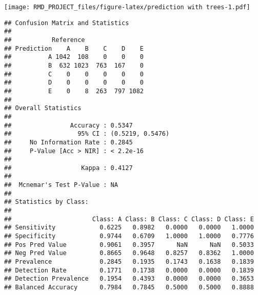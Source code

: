 \documentclass[]{article}
\newenvironment{Shaded}{\begin{snugshade}}{\end{snugshade}}
\newcommand{\CommentTok}[1]{\textcolor[rgb]{0.56,0.35,0.01}{\textit{#1}}}
\newcommand{\DataTypeTok}[1]{\textcolor[rgb]{0.13,0.29,0.53}{#1}}
\newcommand{\DecValTok}[1]{\textcolor[rgb]{0.00,0.00,0.81}{#1}}
\newcommand{\KeywordTok}[1]{\textcolor[rgb]{0.13,0.29,0.53}{\textbf{#1}}}
\newcommand{\NormalTok}[1]{#1}
\newcommand{\OperatorTok}[1]{\textcolor[rgb]{0.81,0.36,0.00}{\textbf{#1}}}
\newcommand{\StringTok}[1]{\textcolor[rgb]{0.31,0.60,0.02}{#1}}
\begin{document}
\begin{Shaded}
\end{Shaded}

\texttt{[image: RMD\_PROJECT\_files/figure-latex/prediction with trees-1.pdf]}

\begin{Shaded}
\end{Shaded}

\begin{verbatim}
## Confusion Matrix and Statistics
## 
##           Reference
## Prediction    A    B    C    D    E
##          A 1042  108    0    0    0
##          B  632 1023  763  167    0
##          C    0    0    0    0    0
##          D    0    0    0    0    0
##          E    0    8  263  797 1082
## 
## Overall Statistics
##                                           
##                Accuracy : 0.5347          
##                  95% CI : (0.5219, 0.5476)
##     No Information Rate : 0.2845          
##     P-Value [Acc > NIR] : < 2.2e-16       
##                                           
##                   Kappa : 0.4127          
##                                           
##  Mcnemar's Test P-Value : NA              
## 
## Statistics by Class:
## 
##                      Class: A Class: B Class: C Class: D Class: E
## Sensitivity            0.6225   0.8982   0.0000   0.0000   1.0000
## Specificity            0.9744   0.6709   1.0000   1.0000   0.7776
## Pos Pred Value         0.9061   0.3957      NaN      NaN   0.5033
## Neg Pred Value         0.8665   0.9648   0.8257   0.8362   1.0000
## Prevalence             0.2845   0.1935   0.1743   0.1638   0.1839
## Detection Rate         0.1771   0.1738   0.0000   0.0000   0.1839
## Detection Prevalence   0.1954   0.4393   0.0000   0.0000   0.3653
## Balanced Accuracy      0.7984   0.7845   0.5000   0.5000   0.8888
\end{verbatim}
\end{document}
